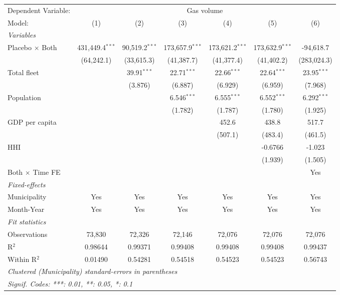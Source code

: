 \documentclass[
]{article}
\begin{document}
\begin{tabular}{lcccccc}
\tabularnewline\midrule\midrule
Dependent Variable:&\multicolumn{6}{c}{Gas volume}\\
Model:&(1) & (2) & (3) & (4) & (5) & (6)\\
\midrule \emph{Variables}&   &   &   &   &   &  \\
Placebo $\times $ Both & 431,449.4$^{***}$ & 90,519.2$^{***}$ & 173,657.9$^{***}$ & 173,621.2$^{***}$ & 173,632.9$^{***}$ & -94,618.7\\
  &(64,242.1) & (33,615.3) & (41,387.7) & (41,377.4) & (41,402.2) & (283,024.3)\\
Total fleet &    & 39.91$^{***}$ & 22.71$^{***}$ & 22.66$^{***}$ & 22.64$^{***}$ & 23.95$^{***}$\\
  &   & (3.876) & (6.887) & (6.929) & (6.959) & (7.968)\\
Population &    &    & 6.546$^{***}$ & 6.555$^{***}$ & 6.552$^{***}$ & 6.292$^{***}$\\
  &   &    & (1.782) & (1.787) & (1.780) & (1.925)\\
GDP per capita &    &    &    & 452.6 & 438.8 & 517.7\\
  &   &    &    & (507.1) & (483.4) & (461.5)\\
HHI &    &    &    &    & -0.6766 & -1.023\\
  &   &    &    &    & (1.939) & (1.505)\\
Both $\times$ Time FE &  &  &  &  &  & Yes\\
\midrule \emph{Fixed-effects}&   &   &   &   &   &  \\
Municipality & Yes & Yes & Yes & Yes & Yes & Yes\\
Month-Year & Yes & Yes & Yes & Yes & Yes & Yes\\
\midrule \emph{Fit statistics}&  & & & & & \\
Observations & 73,830&72,326&72,146&72,076&72,076&72,076\\
R$^2$ & 0.98644&0.99371&0.99408&0.99408&0.99408&0.99437\\
Within R$^2$ & 0.01490&0.54281&0.54518&0.54523&0.54523&0.56743\\
\midrule\midrule\multicolumn{7}{l}{\emph{Clustered (Municipality) standard-errors in parentheses}}\\
\multicolumn{7}{l}{\emph{Signif. Codes: ***: 0.01, **: 0.05, *: 0.1}}\\
\end{tabular}
\end{document}
